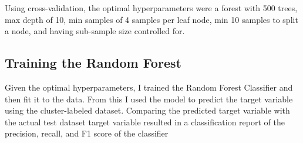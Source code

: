 \documentclass[12pt]{article}
\begin{document}
\noindent
Using cross-validation, the optimal hyperparameters were a forest with 500 trees, max depth of 10, min samples of 4 samples per leaf node, min 10 samples to split a node, and having sub-sample size controlled for.

\subsection*{Training the Random Forest}
Given the optimal hyperparameters, I trained the Random Forest Classifier and then fit it to the data. From this I used the model to predict the target variable using the cluster-labeled dataset. Comparing the predicted target variable with the actual test dataset target variable resulted in a classification report of the precision, recall, and F1 score of the classifier \\
\end{document}
